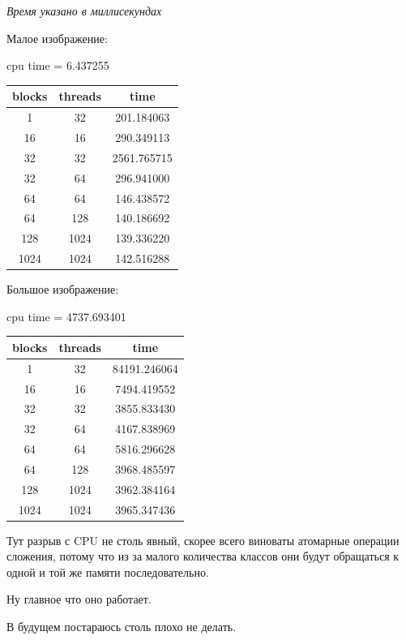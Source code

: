 \documentclass[12pt]{article}
\begin{document}
\newpage

\textit{Время указано в миллисекундах}

Малое изображение:

\begin{center}
	cpu time = 6.437255
	\begin{table}[!htb]
		\centering
		\begin{tabular}{|c|c|c|}
			\hline
			blocks & threads & time        \\
			\hline

			1      & 32      & 201.184063  \\
			16     & 16      & 290.349113  \\
			32     & 32      & 2561.765715 \\
			32     & 64      & 296.941000  \\
			64     & 64      & 146.438572  \\
			64     & 128     & 140.186692  \\
			128    & 1024    & 139.336220  \\
			1024   & 1024    & 142.516288  \\
			\hline
		\end{tabular}
	\end{table}
\end{center}

Большое изображение:

\begin{center}
	cpu time = 4737.693401
	\begin{table}[!htb]
		\centering
		\begin{tabular}{|c|c|c|}
			\hline
			blocks & threads & time         \\
			\hline

			1      & 32      & 84191.246064 \\
			16     & 16      & 7494.419552  \\
			32     & 32      & 3855.833430  \\
			32     & 64      & 4167.838969  \\
			64     & 64      & 5816.296628  \\
			64     & 128     & 3968.485597  \\
			128    & 1024    & 3962.384164  \\
			1024   & 1024    & 3965.347436  \\
			\hline
		\end{tabular}
	\end{table}
\end{center}


Тут разрыв с CPU не столь явный, скорее всего виноваты атомарные операции сложения,
потому что из за малого количества классов они будут обращаться к одной и той же памяти
последовательно.

Ну главное что оно работает.

В будущем постараюсь столь плохо не делать.
\end{document}
